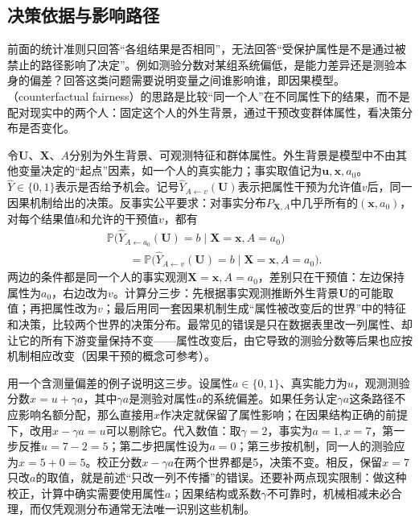 \subsection{决策依据与影响路径}
\label{sec:fairness-counterfactual-comparison}

前面的统计准则只回答“各组结果是否相同”，无法回答“受保护属性是不是通过被禁止的路径影响了决定”。例如测验分数对某组系统偏低，是能力差异还是测验本身的偏差？回答这类问题需要说明变量之间谁影响谁，即因果模型。（counterfactual fairness）的思路是比较“同一个人”在不同属性下的结果，而不是配对现实中的两个人：固定这个人的外生背景，通过干预改变群体属性，看决策分布是否变化。

令$\bm U$、$\bm X$、$A$分别为外生背景、可观测特征和群体属性。外生背景是模型中不由其他变量决定的“起点”因素，如一个人的真实能力；事实取值记为$\bm u,\bm x,a_0$。$\hat Y\in\{0,1\}$表示是否给予机会。记号$\hat Y_{A\leftarrow v}(\bm U)$表示把属性干预为允许值$v$后，同一因果机制给出的决策。反事实公平要求：对事实分布$P_{\bm X,A}$中几乎所有的$(\bm{x},a_0)$，对每个结果值$b$和允许的干预值$v$，都有
\begin{equation}
\begin{aligned}
 &\mathbb P\bigl(\hat Y_{A\leftarrow a_0}(\bm U)=b
       \mid\bm X=\bm x,A=a_0\bigr)\\
 &\qquad=\mathbb P\bigl(\hat Y_{A\leftarrow v}(\bm U)=b
       \mid\bm X=\bm x,A=a_0\bigr).
\end{aligned}
 \label{eq:fairness-counterfactual}
\end{equation}
两边的条件都是同一个人的事实观测$\bm X=\bm x,A=a_0$，差别只在干预值：左边保持属性为$a_0$，右边改为$v$。计算分三步：先根据事实观测推断外生背景$\bm U$的可能取值；再把属性改为$v$；最后用同一套因果机制生成“属性被改变后的世界”中的特征和决策，比较两个世界的决策分布。最常见的错误是只在数据表里改一列属性、却让它的所有下游变量保持不变——属性改变后，由它导致的测验分数等后果也应按机制相应改变（因果干预的概念可参考）。

用一个含测量偏差的例子说明这三步。设属性$a\in\{0,1\}$、真实能力为$u$，观测测验分数$x=u+\gamma a$，其中$\gamma a$是测验对属性$a$的系统偏差。如果任务认定$\gamma a$这条路径不应影响名额分配，那么直接用$x$作决定就保留了属性影响；在因果结构正确的前提下，改用$x-\gamma a=u$可以剔除它。代入数值：取$\gamma=2$，事实为$a=1,x=7$，第一步反推$u=7-2=5$；第二步把属性设为$a=0$；第三步按机制，同一人的测验应为$x=5+0=5$。校正分数$x-\gamma a$在两个世界都是5，决策不变。相反，保留$x=7$只改$a$的取值，就是前述“只改一列不传播”的错误。还要补两点现实限制：做这种校正，计算中确实需要使用属性$a$；因果结构或系数$\gamma$不可靠时，机械相减未必合理，而仅凭观测分布通常无法唯一识别这些机制。

